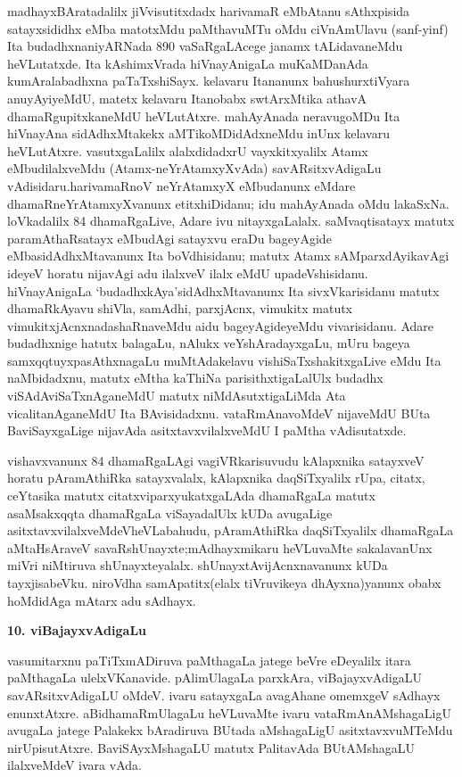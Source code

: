 madhayxBAratadalilx jiVvisutitxdadx harivamaR eMbAtanu sAthxpisida satayxsididhx eMba matotxMdu paMthavuMTu oMdu ciVnAmUlavu (sanf-yinf) Ita budadhxna\break niyAR\-Nada 890 vaSaRgaLAcege janamx tALidavaneMdu heVLutatxde. Ita kAshimxVrada hiVnayAni\-gaLa muKaMDanAda kumAralabadhxna paTaTxshiSayx. kelavaru Itananunx bahu\-shurxtiVyara anu\-yAyiyeMdU, matetx kelavaru Itanobabx swtArxMtika athavA dhamaRgupitxkaneMdU heVLutAtxre. mahAyAnada neravugoMDu Ita hiVnayAna sidAdhxM\-takekx aMTikoMDi\-dAdxneMdu inUnx kelavaru heVLutAtxre. vasutxgaLalilx alalxdidadxrU vayxkitx\-yalilx Atamx eMbu\-dilalxveMdu (Atamx-neYrAtamxyXvAda) savARsitxvAdigaLu vAdisidaru.\break hari\-vamaRnoV neYrAtamxyX eMbudanunx eMdare dhamaRneYrAtamxyXvanunx etitxhiDidanu; idu mahAyAnada oMdu lakaSxNa. loVkadalilx 84 dhamaRgaLive, Adare ivu nitayxgaLalalx. saMvaqtisatayx matutx paramAthaRsatayx eMbudAgi satayxvu eraDu bageyAgide eMba\break sidAdhxMta\-vanunx Ita boVdhisidanu; matutx Atamx sAMparxdAyikavAgi ideyeV \hbox{horatu} nijavAgi adu ilalxveV ilalx eMdU upadeVshisidanu. hiVnayAnigaLa `budadhxkAya'\break sidAdhxMtavanunx Ita sivxVkarisidanu matutx dhamaRkAyavu shiVla, samAdhi, parxjAcnx, \hbox{vimukitx} matutx vimukitxjAcnxnadashaRnaveMdu aidu bageyAgideyeMdu vivarisidanu. Adare budadhx\-nige hatutx balagaLu, nAlukx veYshAradayxgaLu, mUru bageya samxqqtuyxpasAthxnagaLu muMtAda\break kelavu vishiSaTxshakitxgaLive eMdu Ita naMbidadxnu, matutx eMtha kaThiNa parisithxtigaLalUlx \hbox{budadhx} viSAdAviSaTxnAganeMdU matutx niMdAsutxtigaLiMda Ata vicalitanAganeMdU Ita BAvi\-sidadxnu. vataRmAnavoMdeV nijaveMdU BUta BaviSayxgaLige nijavAda asitxtavxvilalxveMdU I paMtha vAdisutatxde.

vishavxvanunx 84 dhamaRgaLAgi vagiVRkarisuvudu kAlapxnika satayxveV horatu pAra\-mAthiRka satayxvalalx, kAlapxnika daqSiTxyalilx rUpa, citatx, ceYtasika matutx citatxviparxyukatxgaLAda dhamaRgaLa matutx asaMsakxqqta dhamaRgaLa viSayadalUlx kUDa avugaLige asitxtavxvilalxveMdeV\break heVLabahudu, pAramAthiRka daqSiTxyalilx dhamaRgaLa aMtaHsAraveV savaRshUnayxte;\break mAdhayxmikaru heVLuvaMte sakalavanUnx miVri niMtiruva shUnayxteyalalx. shUnayxtA\-vijAcnxnavanunx kUDa tayxjisabeVku. niroVdha samApatitx(elalx tiVruvikeya dhAyxna)yanunx obabx hoMdidAga mAtarx adu sAdhayx.

\begin{center}
{\textbf{\Large 10. viBajayxvAdigaLu}}
\end{center}

vasumitarxnu paTiTxmADiruva paMthagaLa jatege beVre eDeyalilx itara paMthagaLa ulelxVKanavide. pAlimUlagaLa parxkAra, viBajayxvAdigaLU savARsitxvAdigaLU oMdeV. ivaru satayxgaLa avagAhane omemxgeV sAdhayx enunxtAtxre. aBidhamaRmUlagaLu heVLuvaMte ivaru vataRmAnAMshagaLigU avugaLa jatege Palakekx bAradiruva BUtada aMshagaLigU asitxtavxvuMTeMdu nirUpisutAtxre. BaviSAyxMshagaLU matutx PalitavAda BUtAMshagaLU ilalxveMdeV ivara vAda.


